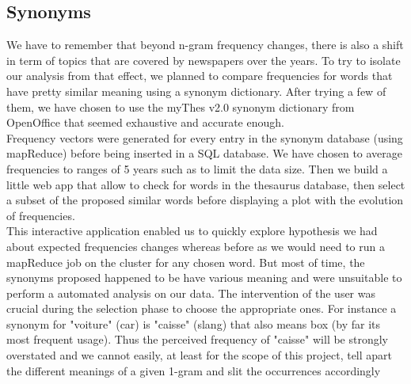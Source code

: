 \subsection{Synonyms}

We have to remember that beyond n-gram frequency changes, there is also a shift in term of topics that are covered by newspapers over the years. To try to isolate our analysis from that effect, we planned to compare frequencies for words that have pretty similar meaning using a synonym dictionary. After trying a few of them, we have chosen to use the myThes v2.0 synonym dictionary from OpenOffice that seemed exhaustive and accurate enough. \\

Frequency vectors were generated for every entry in the synonym database (using mapReduce) before being inserted in a SQL database. We have chosen to average frequencies to ranges of 5 years such as to limit the data size. Then we build a little web app that allow to check for words in the thesaurus database, then select a subset of the proposed similar words before displaying a plot with the evolution of frequencies.\\

This interactive application enabled us to quickly explore hypothesis we had about expected frequencies changes whereas before as we would need to run a mapReduce job on the cluster for any chosen word. But most of time, the synonyms proposed happened to be have various meaning and were unsuitable to perform a automated analysis on our data. The intervention of the user was crucial during the selection phase to choose the appropriate ones. For instance a synonym for "voiture" (car) is "caisse" (slang) that also means box (by far its most frequent usage). Thus the perceived frequency of "caisse" will be strongly overstated and we cannot easily, at least for the scope of this project, tell apart the different meanings of a given 1-gram and slit the occurrences accordingly

